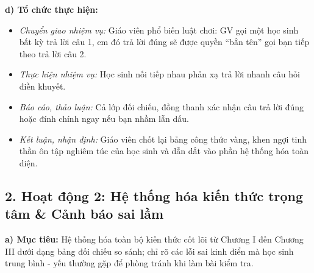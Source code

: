 \documentclass[12pt, a4paper]{article}
\begin{document}
\noindent \textbf{d) Tổ chức thực hiện:}
\begin{itemize}[leftmargin=0.8cm]
    \item \textit{Chuyển giao nhiệm vụ:} Giáo viên phổ biến luật chơi: GV gọi một học sinh bất kỳ trả lời câu 1, em đó trả lời đúng sẽ được quyền ``bắn tên'' gọi bạn tiếp theo trả lời câu 2.
    \item \textit{Thực hiện nhiệm vụ:} Học sinh nối tiếp nhau phản xạ trả lời nhanh câu hỏi điền khuyết.
    \item \textit{Báo cáo, thảo luận:} Cả lớp đối chiếu, đồng thanh xác nhận câu trả lời đúng hoặc đính chính ngay nếu bạn nhầm lẫn dấu.
    \item \textit{Kết luận, nhận định:} Giáo viên chốt lại bảng công thức vàng, khen ngợi tinh thần ôn tập nghiêm túc của học sinh và dẫn dắt vào phần hệ thống hóa toàn diện.
\end{itemize}

\subsection*{2. Hoạt động 2: Hệ thống hóa kiến thức trọng tâm \& Cảnh báo sai lầm}

\noindent \textbf{a) Mục tiêu:}
Hệ thống hóa toàn bộ kiến thức cốt lõi từ Chương I đến Chương III dưới dạng bảng đối chiếu so sánh; chỉ rõ các lỗi sai kinh điển mà học sinh trung bình - yếu thường gặp để phòng tránh khi làm bài kiểm tra.
\end{document}
